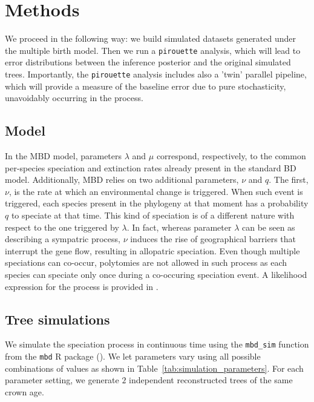 \section{Methods}

We proceed in the following way: we build simulated datasets generated under the multiple birth model. Then we run a \verb;pirouette; analysis, which will lead to error distributions between the inference posterior and the original simulated trees. Importantly, the \verb;pirouette; analysis includes also a 'twin' parallel pipeline, which will provide a measure of the baseline error due to pure stochasticity, unavoidably occurring in the process.

\subsection{Model}

In the MBD model, parameters $\lambda$ and $\mu$ correspond, respectively, 
to the common per-species speciation and extinction rates 
already present in the standard BD model. 
Additionally, MBD relies on two additional parameters, $\nu$ and $q$. 
The first, $\nu$, is the rate at which an environmental change is triggered.
When such event is triggered, each species present in the phylogeny 
at that moment has a probability $q$ to speciate at that time.
This kind of speciation is of a different nature with respect to 
the one triggered by $\lambda$. 
In fact, whereas parameter $\lambda$ can be seen as 
describing a sympatric process, $\nu$ induces the rise of 
geographical barriers that interrupt the gene flow,
resulting in allopatric speciation. 
Even though multiple speciations can co-occur, 
polytomies are not allowed in such process as each species can speciate only 
once during a co-occuring speciation event.
A likelihood expression for the process is provided in \cite{mbd}.

\subsection{Tree simulations}

We simulate the speciation process in continuous time 
using the \verb;mbd_sim; function from the \verb;mbd; R package (\citep{mbd}).
We let parameters vary using all possible combinations of values 
as shown in Table~\ref{tab:simulation_parameters}.
For each parameter setting, 
we generate $2$  
independent reconstructed trees of the same crown age.

